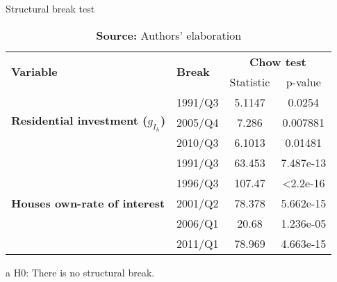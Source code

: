 \begin{table}[H]
	\centering
	\caption{Structural break test}
	\label{structbreak}
	\begin{threeparttable}
		\begin{tabular}{l|l|cc}
			\hline \hline
			\multirow{2}{*}{\textbf{Variable}} & \multirow{2}{*}{\textbf{Break}} & \multicolumn{2}{c}{\textbf{Chow test}\tnote{a}} \\ \cline{3-4} 
			&& Statistic & p-value \\ \hline
			\multirow{3}{*}{\textbf{Residential investment ($g_{I_h}$)}} & 1991/Q3 & 5.1147 & 0.0254 \\
			& 2005/Q4 & 7.286 & 0.007881 \\
			& 2010/Q3 & 6.1013 & 0.01481 \\ \hline
			\multirow{5}{*}{\textbf{Houses own-rate of interest}} & 1991/Q3 & 63.453 & 7.487e-13 \\
			& 1996/Q3 & 107.47 & \textless 2.2e-16 \\
			& 2001/Q2 & 78.378 & 5.662e-15 \\
			& 2006/Q1 & 20.68 & 1.236e-05 \\
			& 2011/Q1 & 78.969 & 4.663e-15 \\ \hline
			\hline \hline
		\end{tabular}%
	\begin{tablenotes}\footnotesize
		\item [a] H0: There is no structural break.
	\end{tablenotes}
\end{threeparttable}
	\caption*{\textbf{Source:} Authors' elaboration}
\end{table}
